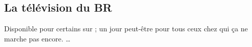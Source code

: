
\subsection{La t\'el\'evision du BR}
\label{TV}

Disponible pour certains sur  ; un jour peut-\^etre pour tous ceux chez qui ça ne marche pas encore. \dots







